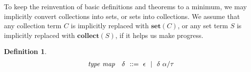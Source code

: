 \documentclass[acmsmall]{acmart}
\theoremstyle{definition}
\newtheorem{definition}{Definition}[section]
\newtheorem{property}{Property}[section]
\begin{document}
\noindent
To keep the reinvention of basic definitions and theorems to a minimum, 
we may implicitly convert collections into sets, or sets into collections.
We assume that any collection term $C$ is implicitly replaced with $\textbf{set}(C)$,
or any set term $S$ is implicitly replaced with $\textbf{collect}(S)$, if it helps
us make progress.







\begin{definition}
  \label{def:type_map}
  \[\begin{array}[t]{rr@{}l}
    \com{type map} &
    \nonterm{\delta} & \is \epsilon \sep \delta\ \alpha \slash \tau
  \end{array}\]
\end{definition}
\end{document}
